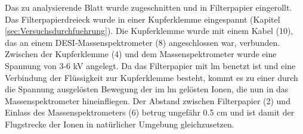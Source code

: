 Das zu analysierende Blatt wurde zugeschnitten und in Filterpapier eingerollt. Das Filterpapierdreieck wurde in einer Kupferklemme eingespannt (Kapitel \ref{sec:Versuchsdurchfuehrung}). Die Kupferklemme wurde mit einem Kabel (10), das an einem DESI-Massenspektrometer (8) angeschlossen war, verbunden. Zwischen der Kupferklemme (4) und dem Massenspektrometer wurde eine Spannung von 3-6 kV angelegt. Da das Filterpapier mit \gls{lm} benetzt ist und eine Verbindung der Flüssigkeit zur Kupferklemme besteht, kommt es zu einer durch die Spannung ausgelösten Bewegung der im \gls{lm} gelösten Ionen, die nun in das Massenspektrometer hineinfliegen. Der Abstand zwischen Filterpapier (2) und Einlass des Massenspektrometers (6) betrug ungefähr 0.5 cm und ist damit der Flugstrecke der Ionen in natürlicher Umgebung gleichzusetzen. 

